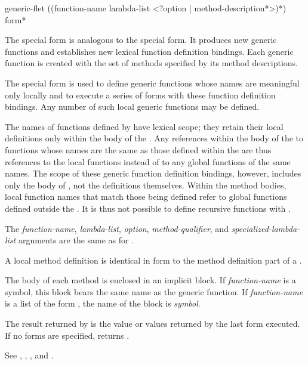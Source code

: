 \begin{defspec}
generic-flet ({(function-name lambda-list
                <?option | {method-description}*>)}*)
            {\,form}*

The  special form is analogous to the
 special form.  It produces new generic functions and
establishes new lexical function definition bindings.  Each generic
function is created with the set of methods specified by its method
descriptions.


The special form  is used to define generic functions whose
names are meaningful only locally and to execute a series of forms
with these function definition bindings.  Any number of such local
generic functions may be defined.


The names of functions defined by  have lexical
scope; they retain their local definitions only within the body of the
.  Any references within the body of the 
 to functions whose names are the same as those defined
within the  are thus references to the local
functions instead of to any global functions of the same names.  The
scope of these generic function definition bindings, however, includes only
the body of , not the definitions themselves.
Within the method bodies, local function names that match those
being defined refer to global functions defined outside the 
.  It is thus not possible to define recursive functions
with .


The \emph{function-name\/}, \emph{lambda-list\/}, \emph{option}, \emph{
method-qualifier}, and \emph{specialized-lambda-list\/} arguments are
the same as for .


A  local method definition is identical in form to the
method definition part of a .


The body of each method is enclosed in an implicit block.  If \emph{
function-name\/} is a symbol, this block bears the same name as
the generic function.  If \emph{function-name\/} is a list of the
form , the name of the block is \emph{
symbol}.


The result returned by  is the value or values
returned by the last form executed.  If no forms are specified, 
 returns .

See , , , and .
\end{defspec}


